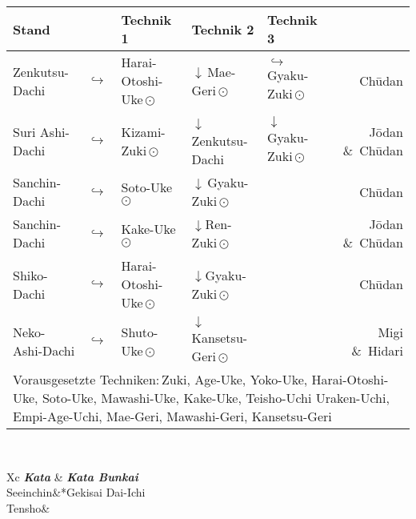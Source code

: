 \begin{tcolorbox}[width=\textwidth,height=\textheight,right=12pt,left=12pt,colframe=BRBELT,colback=white,fonttitle=\bfseries,coltitle=white,title=3. Kyu:\indent Kihon-Ido Kata - Partnerformen - Erwartungshorizont]	
	\null\vfill\null
	\begin{tabularx}{\textwidth}{llllXr}
		\textbf{Stand} 	&  	& \textbf{Technik 1} & \textbf{Technik 2} 				& \textbf{Technik 3}&\\
		\midrule
		Zenkutsu-Dachi 	& \(\hookrightarrow\)	& Harai-Otoshi-Uke\,\(\odot\) 	& \(\downarrow\)\,Mae-Geri\,\(\odot\)	& \(\hookrightarrow\) 	 Gyaku-Zuki\,\(\odot\)	& Ch\={u}dan \\
		Suri Ashi-Dachi	& \(\hookrightarrow\)	& Kizami-Zuki\,\(\odot\)		& \(\downarrow\)\,Zenkutsu-Dachi & \(\downarrow\)	 Gyaku-Zuki\,\(\odot\)	& J\={o}dan \&~Ch\={u}dan \\
		Sanchin-Dachi 	& \(\hookrightarrow\)	& Soto-Uke\,\(\odot\) 			& \(\downarrow\)\,Gyaku-Zuki\,\(\odot\) 				&						&	 					 Ch\={u}dan \\
		Sanchin-Dachi 	& \(\hookrightarrow\)	& Kake-Uke\,\(\odot\) 			& \(\downarrow\)Ren-Zuki\,\(\odot\) 					&						& 						 J\={o}dan \&~Ch\={u}dan \\
		Shiko-Dachi 	& \(\hookrightarrow\)	& Harai-Otoshi-Uke\,\(\odot\) 	& \(\downarrow\)Gyaku-Zuki\,\(\odot\) 				&						& 						 Ch\={u}dan \\
		Neko-Ashi-Dachi	& \(\hookrightarrow\)	& Shuto-Uke\,\(\odot\) 			& \(\downarrow\)Kansetsu-Geri\,\(\odot\) 					&						& 						 Migi \&~Hidari  \\
		\multicolumn{6}{p{\linewidth-2\tabcolsep}}{{\footnotesize Vorausgesetzte Techniken:\,Zuki, Age-Uke, Yoko-Uke, Harai-Otoshi-Uke, Soto-Uke, Mawashi-Uke, Kake-Uke, Teisho-Uchi Uraken-Uchi, Empi-Age-Uchi, Mae-Geri, Mawashi-Geri, Kansetsu-Geri}}\\
		\midrule
	\end{tabularx}\\
	\begin{center}
		\begin{minipage}[t]{0.45\textwidth}
			\begin{tabularx}{\textwidth}{Xc}
				\midrule
				\textbf{\textit{Kata}} & \textbf{\textit{Kata Bunkai}} \\
				Seeinchin&*{Gekisai Dai-Ichi}\\
				Tensho& \\
				\midrule
			\end{tabularx}

\end{minipage}
\end{center}
\end{tcolorbox}
